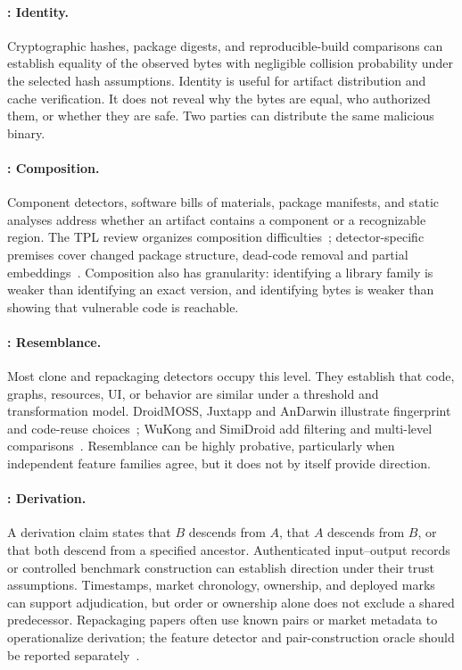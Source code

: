 \paragraph{: Identity.}
Cryptographic hashes, package digests, and reproducible-build comparisons can establish equality of the observed bytes with negligible collision probability under the selected hash assumptions. Identity is useful for artifact distribution and cache verification. It does not reveal why the bytes are equal, who authorized them, or whether they are safe. Two parties can distribute the same malicious binary.

\paragraph{: Composition.}
Component detectors, software bills of materials, package manifests, and static analyses address whether an artifact contains a component or a recognizable region. The TPL review organizes composition difficulties~\cite{tpl}; detector-specific premises cover changed package structure, dead-code removal and partial embeddings~\cite{libscout,libid,orlis}. Composition also has granularity: identifying a library family is weaker than identifying an exact version, and identifying bytes is weaker than showing that vulnerable code is reachable.

\paragraph{: Resemblance.}
Most clone and repackaging detectors occupy this level. They establish that code, graphs, resources, UI, or behavior are similar under a threshold and transformation model. DroidMOSS, Juxtapp and AnDarwin illustrate fingerprint and code-reuse choices~\cite{droidmoss,juxtapp,andarwin}; WuKong and SimiDroid add filtering and multi-level comparisons~\cite{wukong,simidroid}. Resemblance can be highly probative, particularly when independent feature families agree, but it does not by itself provide direction.

\paragraph{: Derivation.}
A derivation claim states that $B$ descends from $A$, that $A$ descends from $B$, or that both descend from a specified ancestor. Authenticated input--output records or controlled benchmark construction can establish direction under their trust assumptions. Timestamps, market chronology, ownership, and deployed marks can support adjudication, but order or ownership alone does not exclude a shared predecessor. Repackaging papers often use known pairs or market metadata to operationalize derivation; the feature detector and pair-construction oracle should be reported separately~\cite{repack,repackeval}.

